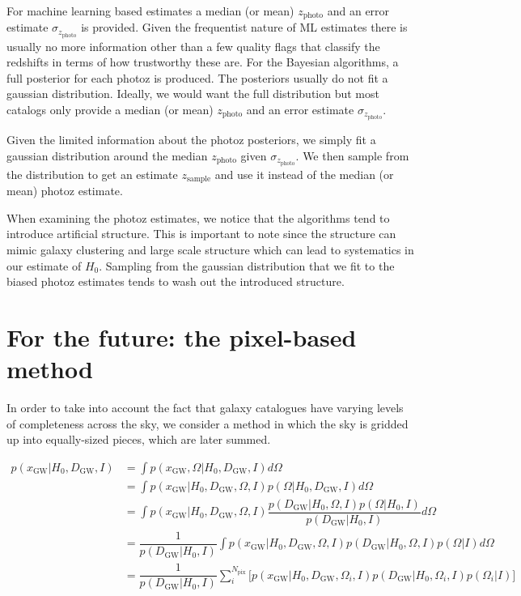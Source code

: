 \documentclass[a4paper,10pt]{article}
\begin{document}
For machine learning based estimates a median (or mean) $z_\text{photo}$ and an error estimate $\sigma_{z_\text{photo}}$ is provided. Given the frequentist nature of ML estimates there is usually no more information other than a few quality flags that classify the redshifts in terms of how trustworthy these are. 
For the Bayesian algorithms, a full posterior for each photoz is produced. The posteriors usually do not fit a gaussian distribution. Ideally, we would want the full distribution but most catalogs only provide a median (or mean) $z_\text{photo}$ and an error estimate $\sigma_{z_\text{photo}}$.

Given the limited information about the photoz posteriors, we simply fit a gaussian distribution around the median $z_\text{photo}$ given $\sigma_{z_\text{photo}}$. We then sample from the distribution to get an estimate $z_\text{sample}$ and use it instead of the median (or mean) photoz estimate.

When examining the photoz estimates, we notice that the algorithms tend to introduce artificial structure. This is important to note since the structure can mimic galaxy clustering and large scale structure which can lead to systematics in our estimate of $H_0$. Sampling from the gaussian distribution that we fit to the biased photoz estimates tends to wash out the introduced structure.


\section{For the future: the pixel-based method \label{Sec: Future}}
In order to take into account the fact that galaxy catalogues have varying levels of completeness across the sky, we consider a method in which the sky is gridded up into equally-sized pieces, which are later summed.

\begin{equation}
\begin{aligned}
p(x_{\text{GW}}|H_0,D_{\text{GW}},I) &= \int p(x_{\text{GW}},\Omega|H_0,D_{\text{GW}},I) d\Omega
\\ & = \int p(x_{\text{GW}}|H_0,D_{\text{GW}},\Omega,I) p(\Omega|H_0,D_{\text{GW}},I) d\Omega
\\ & = \int p(x_{\text{GW}}|H_0,D_{\text{GW}},\Omega,I) \dfrac{p(D_{\text{GW}}|H_0,\Omega,I)p(\Omega|H_0,I)}{p(D_{\text{GW}}|H_0,I)}  d\Omega
\\ &= \dfrac{1}{p(D_{\text{GW}}|H_0,I)} \int p(x_{\text{GW}}|H_0,D_{\text{GW}},\Omega,I) p(D_{\text{GW}}|H_0,\Omega,I)p(\Omega|I) d\Omega
\\ &= \dfrac{1}{p(D_{\text{GW}}|H_0,I)} \sum^{N_{\text{pix}}}_i \bigg[p(x_{\text{GW}}|H_0,D_{\text{GW}},\Omega_i,I) p(D_{\text{GW}}|H_0,\Omega_i,I)p(\Omega_i|I)\bigg]
\end{aligned} 
\end{equation}
\end{document}
